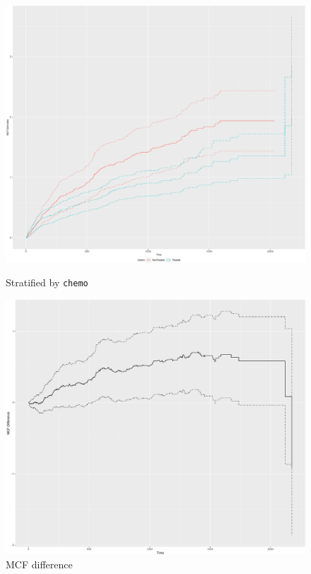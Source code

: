 \vspace*{-.3cm}\begin{figure}[H]
    \centering
    \begin{minipage}{0.245\textwidth}
        \centering
        \includegraphics[scale = .125]{images/plot-sampleMcf-1}
        \caption{Stratified by \texttt{chemo}}
    \end{minipage}\hfill
    \begin{minipage}{0.245\textwidth}
        \centering
        \includegraphics[scale = .125]{images/mcfdiffplot-1}
        \caption{MCF difference}
    \end{minipage}
\end{figure}

